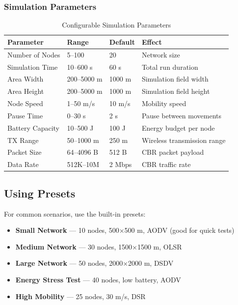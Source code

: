 \documentclass[12pt,a4paper]{article}
\begin{document}
\subsubsection{Simulation Parameters}

\begin{table}[H]
\centering
\caption{Configurable Simulation Parameters}
\begin{tabular}{llll}
\toprule
\textbf{Parameter} & \textbf{Range} & \textbf{Default} & \textbf{Effect} \\
\midrule
Number of Nodes      & 5--100    & 20      & Network size \\
Simulation Time      & 10--600 s & 60 s    & Total run duration \\
Area Width           & 200--5000 m & 1000 m & Simulation field width \\
Area Height          & 200--5000 m & 1000 m & Simulation field height \\
Node Speed           & 1--50 m/s & 10 m/s  & Mobility speed \\
Pause Time           & 0--30 s   & 2 s     & Pause between movements \\
Battery Capacity     & 10--500 J & 100 J   & Energy budget per node \\
TX Range             & 50--1000 m & 250 m  & Wireless transmission range \\
Packet Size          & 64--4096 B & 512 B  & CBR packet payload \\
Data Rate            & 512K--10M & 2 Mbps  & CBR traffic rate \\
\bottomrule
\end{tabular}
\end{table}

\subsection{Using Presets}

For common scenarios, use the built-in presets:

\begin{itemize}[leftmargin=1.5em]
  \item \textbf{Small Network} — 10 nodes, 500×500 m, AODV (good for quick tests)
  \item \textbf{Medium Network} — 30 nodes, 1500×1500 m, OLSR
  \item \textbf{Large Network} — 50 nodes, 2000×2000 m, DSDV
  \item \textbf{Energy Stress Test} — 40 nodes, low battery, AODV
  \item \textbf{High Mobility} — 25 nodes, 30 m/s, DSR
\end{itemize}
\end{document}
